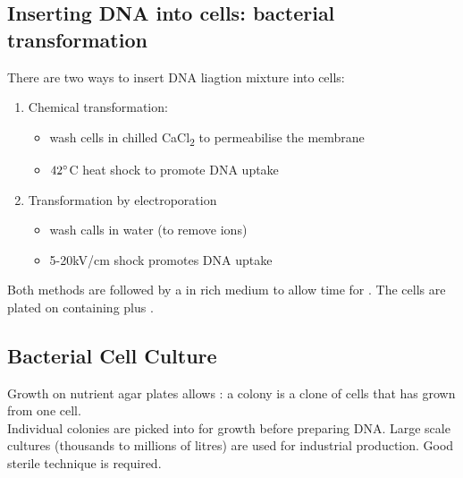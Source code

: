 \subsection{Inserting DNA into cells: bacterial transformation}
There are two ways to insert DNA liagtion mixture into cells:
\begin{enumerate} 
    \item Chemical transformation:
    \begin{itemize}
        \item wash cells in chilled CaCl\textsubscript{2} to permeabilise the membrane
        \item $ 42\degree$C heat shock to promote DNA uptake
    \end{itemize}
    \item Transformation by electroporation
    \begin{itemize}
        \item wash calls in water (to remove ions)
        \item 5-20kV/cm shock promotes DNA uptake
    \end{itemize}
\end{enumerate}
Both methods are followed by a  in rich medium to allow time for . The cells are plated on  containing  plus .
\subsection{Bacterial Cell Culture}
Growth on nutrient agar plates allows : a colony is a clone of cells that has grown from one cell.\\[.1in]
Individual colonies are picked into  for growth before preparing DNA. Large scale cultures (thousands to millions of litres) are used for industrial production. Good sterile technique is required.

